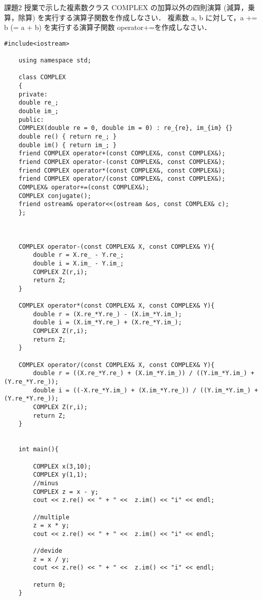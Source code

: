 \documentclass[fleqn, a4paper. 12pt]{ltjsarticle} %
\begin{document}
\newpage

\begin{itembox}[l]{課題2}
    授業で示した複素数クラス COMPLEX の加算以外の四則演算 (減算，乗算，除算) を実行する演算子関数を作成しなさい．
    複素数 a, b に対して，a += b (= a + b) を実行する演算子関数 operator+=を作成しなさい．
\end{itembox}


\begin{lstlisting}[caption=kadai2, label=program2]
    #include<iostream>

    using namespace std;
    
    class COMPLEX
    {
    private:
    double re_;
    double im_;
    public:
    COMPLEX(double re = 0, double im = 0) : re_{re}, im_{im} {}
    double re() { return re_; }
    double im() { return im_; }
    friend COMPLEX operator+(const COMPLEX&, const COMPLEX&);
    friend COMPLEX operator-(const COMPLEX&, const COMPLEX&);
    friend COMPLEX operator*(const COMPLEX&, const COMPLEX&);
    friend COMPLEX operator/(const COMPLEX&, const COMPLEX&);
    COMPLEX& operator+=(const COMPLEX&);
    COMPLEX conjugate();
    friend ostream& operator<<(ostream &os, const COMPLEX& c);
    }; 
    
    
    
    COMPLEX operator-(const COMPLEX& X, const COMPLEX& Y){
        double r = X.re_ - Y.re_;
        double i = X.im_ - Y.im_;
        COMPLEX Z(r,i);
        return Z;
    }
    
    COMPLEX operator*(const COMPLEX& X, const COMPLEX& Y){
        double r = (X.re_*Y.re_) - (X.im_*Y.im_);
        double i = (X.im_*Y.re_) + (X.re_*Y.im_);
        COMPLEX Z(r,i);
        return Z;
    }
    
    COMPLEX operator/(const COMPLEX& X, const COMPLEX& Y){
        double r = ((X.re_*Y.re_) + (X.im_*Y.im_)) / ((Y.im_*Y.im_) + (Y.re_*Y.re_));
        double i = ((-X.re_*Y.im_) + (X.im_*Y.re_)) / ((Y.im_*Y.im_) + (Y.re_*Y.re_));
        COMPLEX Z(r,i);
        return Z;
    }
    
    
    int main(){
    
        COMPLEX x(3,10);
        COMPLEX y(1,1);
        //minus
        COMPLEX z = x - y;
        cout << z.re() << " + " <<  z.im() << "i" << endl;
    
        //multiple
        z = x * y;
        cout << z.re() << " + " <<  z.im() << "i" << endl;
    
        //devide
        z = x / y;
        cout << z.re() << " + " <<  z.im() << "i" << endl;
    
        return 0;
    }
\end{lstlisting}
\end{document}
